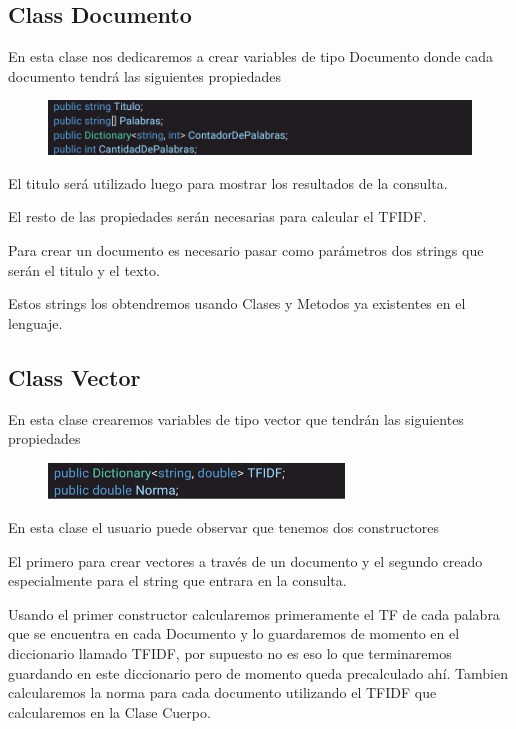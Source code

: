 \documentclass[a4paper,12pt]{article}
\begin{document}
\subsection{Class Documento}\label{sub:Documento}

En esta clase nos dedicaremos a crear variables de tipo Documento donde cada documento tendrá las siguientes propiedades

\begin{figure}[H]
    \centering
    \includegraphics[width=\textwidth]{imagenes/2.jpg}
\end{figure}

El titulo será utilizado luego para mostrar los resultados de la consulta.

El resto de las propiedades serán necesarias para calcular el TFIDF.

Para crear un documento es necesario pasar como parámetros dos strings que serán el titulo y el texto.

Estos strings los obtendremos usando Clases y Metodos ya existentes en el lenguaje.

\subsection{Class Vector}\label{sub:Vector}

En esta clase crearemos variables de tipo vector que tendrán las siguientes propiedades

\begin{figure}[H]
    \centering
    \includegraphics[width=0.7\textwidth]{imagenes/3.jpg}
\end{figure}

En esta clase el usuario puede observar que tenemos dos constructores 

El primero para crear vectores a través de un documento y el segundo creado especialmente para el string 
que entrara en la consulta.

Usando el primer constructor calcularemos primeramente el TF de cada palabra que se encuentra en cada Documento y lo 
guardaremos de momento en el diccionario llamado TFIDF, por supuesto no es eso lo que terminaremos guardando en este diccionario 
pero de momento queda precalculado ahí.
Tambien calcularemos la norma para cada documento utilizando el TFIDF que calcularemos en la Clase Cuerpo.
\end{document}
